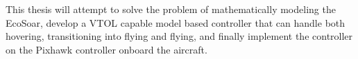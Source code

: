 This thesis will attempt to solve the problem of mathematically modeling the EcoSoar, develop a VTOL capable model based controller that can handle both hovering, transitioning into flying and flying, and finally implement the controller on the Pixhawk controller onboard the aircraft.